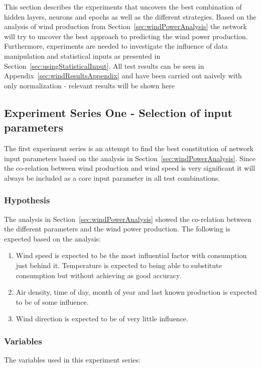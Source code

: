 This section describes the experiments that uncovers the best combination of hidden layers, neurons and epochs as well as the different strategies. Based on the analysis of wind production from Section~\ref{sec:windPowerAnalysis} the network will try to uncover the best approach to predicting the wind power production. Furthermore, experiments are needed to investigate the influence of data manipulation and statistical inputs as presented in Section~\ref{sec:usingStatisticalInput}. All test results can be seen in Appendix~\ref{sec:windResultsAppendix} and have been carried out naively with only normalization - relevant results will be shown here 


\subsection{Experiment Series One - Selection of input parameters}
The first experiment series is an attempt to find the best constitution of network input parameters based on the analysis in Section~\ref{sec:windPowerAnalysis}. Since the co-relation between wind production and wind speed is very significant it will always be included as a core input parameter in all test combinations.

\subsubsection{Hypothesis}
The analysis in Section~\ref{sec:windPowerAnalysis} showed the co-relation between the different parameters and the wind power production. The following is expected based on the analysis:

\begin{enumerate}
\item Wind speed is expected to be the most influential factor with consumption just behind it. Temperature is expected to being able to substitute consumption but without achieving as good accuracy. 
\item Air density, time of day, month of year and last known production is expected to be of some influence.
\item Wind direction is expected to be of very little influence.
\end{enumerate}

\subsubsection{Variables}
The variables used in this experiment series:

